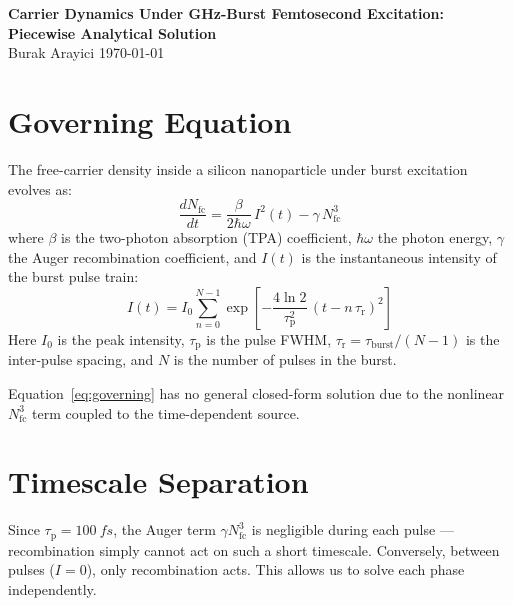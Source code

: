 \documentclass[11pt,a4paper]{article}
\begin{document}
\noindent\textbf{\large Carrier Dynamics Under GHz-Burst Femtosecond Excitation: Piecewise Analytical Solution}\\[4pt]
\noindent Burak Arayici \hfill \today

\bigskip

\section{Governing Equation}

The free-carrier density inside a silicon nanoparticle under burst excitation evolves as:
\begin{equation}
\frac{dN_\text{fc}}{dt} = \frac{\beta}{2\hbar\omega}\,I^2(t) - \gamma\,N_\text{fc}^3
\label{eq:governing}
\end{equation}
where $\beta$ is the two-photon absorption (TPA) coefficient, $\hbar\omega$ the photon energy, $\gamma$ the Auger recombination coefficient, and $I(t)$ is the instantaneous intensity of the burst pulse train:
\begin{equation}
I(t) = I_0 \sum_{n=0}^{N-1} \exp\!\left[-\frac{4\ln 2}{\tau_\text{p}^2}\,(t - n\,\tau_\text{r})^2\right]
\label{eq:pulse_train}
\end{equation}
Here $I_0$ is the peak intensity, $\tau_\text{p}$ is the pulse FWHM, $\tau_\text{r} = \tau_\text{burst}/(N-1)$ is the inter-pulse spacing, and $N$ is the number of pulses in the burst.

Equation~\eqref{eq:governing} has no general closed-form solution due to the nonlinear $N_\text{fc}^3$ term coupled to the time-dependent source.

\section{Timescale Separation}

Since $\tau_\text{p} = \SI{100}{fs}$, the Auger term $\gamma N_\text{fc}^3$ is negligible during each pulse --- recombination simply cannot act on such a short timescale. Conversely, between pulses ($I = 0$), only recombination acts. This allows us to solve each phase independently.

\end{document}
